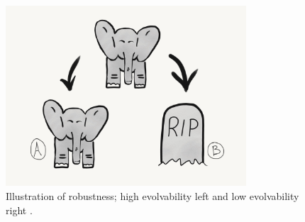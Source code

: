 \begin{figure}
    \centering
    \includegraphics[width=0.8\textwidth]{img/robustness}
 	\captionsetup{singlelinecheck=off,justification=raggedright}
  	\caption{Illustration of robustness; high evolvability left and low evolvability right \cite{Downing2015IntelligenceSystems}.}
    \label{fig:robustness}
\end{figure}